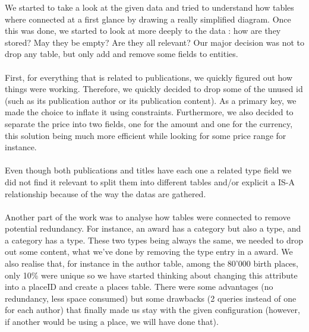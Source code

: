\documentclass[doubleside, titlepage]{article}
\begin{document}
We started to take a look at the given data and tried to understand how tables where connected at a first glance by drawing a really simplified diagram. Once this was done, we started to look at more deeply to the data : how are they stored? May they be empty? Are they all relevant? Our major decision was not to drop any table, but only add and remove some fields to entities.
~\\~\\
First, for everything that is related to publications, we quickly figured out how things were working. Therefore, we quickly decided to drop some of the unused id (such as its publication author or its publication content). As a primary key, we made the choice to inflate it using constraints. Furthermore, we also decided to separate the price into two fields, one for the amount and one for the currency, this solution being much more efficient while looking for some price range for instance. 
~\\~\\
Even though both publications and titles have each one a related type field we did not find it relevant to split them into different tables and/or explicit a IS-A relationship because of the way the datas are gathered.
~\\~\\
Another part of the work was to analyse how tables were connected to remove potential redundancy. For instance, an award has a category but also a type, and a category has a type. These two types being always the same, we needed to drop out some content, what we've done by removing the type entry in a award. We also realise that, for instance in the author table, among the 80'000 birth places, only 10\% were unique so we have started thinking about changing this attribute into a placeID and create a places table. There were some advantages (no redundancy, less space consumed) but some drawbacks (2 queries instead of one for each author) that finally made us stay with the given configuration (however, if another would be using a place, we will have done that).
~\\~\\
\end{document}
